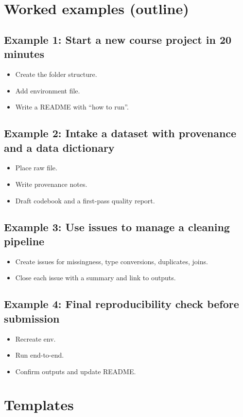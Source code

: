 \section{Worked examples (outline)}
\subsection{Example 1: Start a new course project in 20 minutes}
\begin{itemize}
\item Create the folder structure.
\item Add environment file.
\item Write a README with ``how to run''.
\end{itemize}

\subsection{Example 2: Intake a dataset with provenance and a data dictionary}
\begin{itemize}
\item Place raw file.
\item Write provenance notes.
\item Draft codebook and a first-pass quality report.
\end{itemize}

\subsection{Example 3: Use issues to manage a cleaning pipeline}
\begin{itemize}
\item Create issues for missingness, type conversions, duplicates, joins.
\item Close each issue with a summary and link to outputs.
\end{itemize}

\subsection{Example 4: Final reproducibility check before submission}
\begin{itemize}
\item Recreate env.
\item Run end-to-end.
\item Confirm outputs and update README.
\end{itemize}

\section{Templates}
